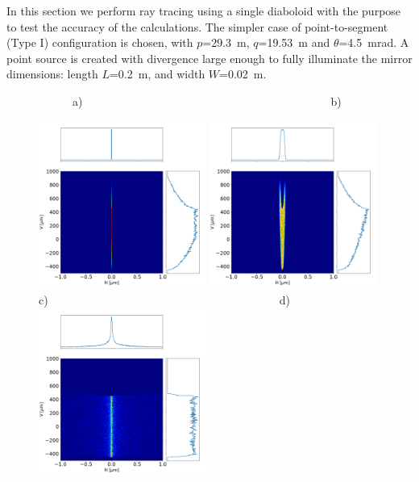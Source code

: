 \documentclass{iucr}              %
\begin{document}
In this section we perform ray tracing using a single diaboloid with the purpose to test the accuracy of the calculations. The simpler case of point-to-segment (Type I) configuration is chosen, with $p$=29.3~m, $q$=19.53~m and $\theta$=4.5~mrad. A point source is created with divergence large enough to fully illuminate the mirror dimensions: 
length $L$=0.2~m, and width $W$=0.02~m.

\begin{figure}\label{fig:pointToSegment}
\flushleft
~~~~~~a)~~~~~~~~~~~~~~~~~~~~~~~~~~~~~~~~~~~~~~~~~~~~b)\\
\centering

\includegraphics[width=0.49\textwidth]{figures/p2s_V_z.png}
\includegraphics[width=0.49\textwidth]{figures/p2s_K_z.png} \\
c)~~~~~~~~~~~~~~~~~~~~~~~~~~~~~~~~~~~~~~~~~d)\\
\includegraphics[width=0.49\textwidth]{figures/p2s_parabolic-cone_z.png}

\end{figure}
\end{document}
